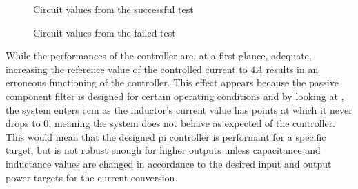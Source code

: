 \begin{figure}[!ht]
\begin{minipage}{\paperwidth}
        \hspace{0.01em}
    \end{minipage}
    \caption{Circuit values from the successful test}
    \label{fig:simres}
\end{figure}
\begin{figure}[!ht]
    \noindent
    \hspace*{-3.05cm}%
    \begin{minipage}{\paperwidth}
        \hspace{0.01em}
    \end{minipage}
    \caption{Circuit values from the failed test}
    \label{fig:failsim}
\end{figure}
While the performances of the controller are, at a first glance, adequate, increasing the reference value of the controlled current to $4A$ results in an erroneous functioning of the controller.
This effect appears because the passive component filter is designed for certain operating conditions and by looking at , the system enters \gls{ccm} as the inductor's current value has points at which it never drops to 0, meaning the system does not behave as expected of the controller.
This would mean that the designed \gls{pi} controller is performant for a specific target, but is not robust enough for higher outputs unless capacitance and inductance values are changed in accordance to the desired input and output power targets for the current conversion.

